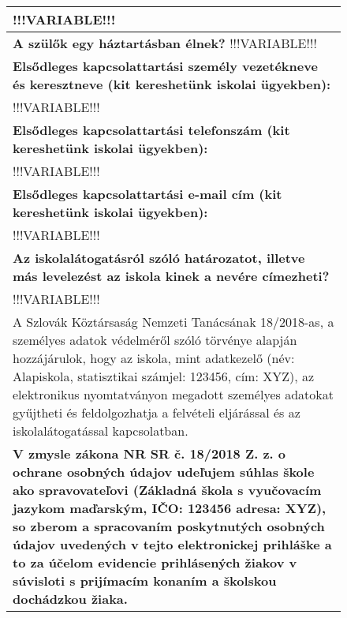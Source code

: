 \documentclass[10pt,a4paper]{article}
\begin{document}
\begin{figure}[!ht]
\begin{tabular}{|m{\textwidth}|}
 \hspace{0.5cm} !!!VARIABLE!!! \vspace{3pt} \\
\hline \vspace{3pt}
\textbf{A szülők egy háztartásban élnek?} \hspace{0.5cm} !!!VARIABLE!!!  \vspace{3pt} \\ 
\hline \vspace{3pt}
\textbf{Elsődleges kapcsolattartási személy vezetékneve és keresztneve (kit kereshetünk iskolai ügyekben):} \vspace{3pt} \\ 
 \hspace{0.5cm} !!!VARIABLE!!! \vspace{3pt} \\
\hline \vspace{3pt}
\textbf{Elsődleges kapcsolattartási telefonszám (kit kereshetünk iskolai ügyekben):} \vspace{3pt} \\ 
 \hspace{0.5cm} !!!VARIABLE!!! \vspace{3pt} \\
\hline \vspace{3pt}
\textbf{Elsődleges kapcsolattartási e-mail cím (kit kereshetünk iskolai ügyekben):} \vspace{3pt} \\ 
 \hspace{0.5cm} !!!VARIABLE!!! \vspace{3pt} \\
\hline \vspace{3pt}
\textbf{Az iskolalátogatásról szóló határozatot, illetve más levelezést az iskola kinek a nevére címezheti?} \vspace{3pt} \\ 
 \hspace{0.5cm} !!!VARIABLE!!! \vspace{3pt} \\
\hline \vspace{3pt}
    A Szlovák Köztársaság Nemzeti Tanácsának 18/2018-as, a személyes adatok védelméről szóló törvénye alapján hozzájárulok, hogy az iskola, mint adatkezelő (név: Alapiskola, statisztikai számjel: 123456, cím: XYZ), az elektronikus nyomtatványon megadott személyes adatokat gyűjtheti és feldolgozhatja a felvételi eljárással és az iskolalátogatással kapcsolatban.  \\
    \textbf{V zmysle zákona NR SR č. 18/2018 Z. z. o ochrane osobných údajov udeľujem súhlas škole ako spravovateľovi (Základná škola s vyučovacím jazykom maďarským, IČO: 123456 adresa: XYZ), so zberom a spracovaním poskytnutých osobných údajov uvedených v tejto elektronickej prihláške a to za účelom evidencie prihlásených žiakov v súvisloti s prijímacím konaním a školskou dochádzkou žiaka.} \vspace{3pt} \\

\end{tabular}
\end{figure}
\end{document}
